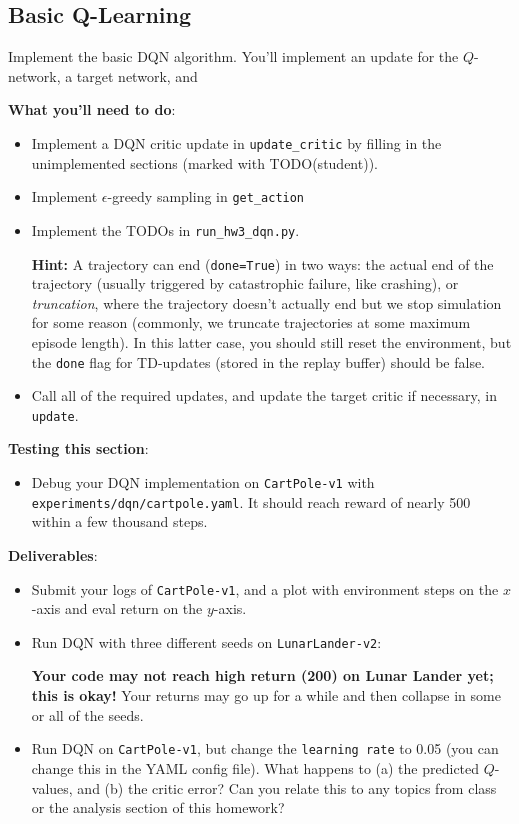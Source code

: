 \documentclass{article}
\begin{document}
\subsection{Basic Q-Learning}

Implement the basic DQN algorithm. You'll implement an update for the $Q$-network, a target network, and 

\textbf{What you'll need to do}:
\begin{itemize}
    \item Implement a DQN critic update in \verb|update_critic| by filling in the unimplemented sections (marked with TODO(student)).
    \item Implement $\epsilon$-greedy sampling in \verb|get_action|
    \item Implement the TODOs in \verb|run_hw3_dqn.py|.

    \textbf{Hint:} A trajectory can end (\verb|done=True|) in two ways: the actual end of the trajectory (usually triggered by catastrophic failure, like crashing), or \textit{truncation}, where the trajectory doesn't actually end but we stop simulation for some reason (commonly, we truncate trajectories at some maximum episode length). In this latter case, you should still reset the environment, but the \verb|done| flag for TD-updates (stored in the replay buffer) should be false.
    \item Call all of the required updates, and update the target critic if necessary, in \verb|update|.
\end{itemize}

\textbf{Testing this section}:
\begin{itemize}
    \item Debug your DQN implementation on \verb|CartPole-v1| with \verb|experiments/dqn/cartpole.yaml|. It should reach reward of nearly 500 within a few thousand steps.
\end{itemize}

\textbf{Deliverables}:
\begin{itemize}
    \item Submit your logs of \verb|CartPole-v1|, and a plot with environment steps on the $x$-axis and eval return on the $y$-axis.
    \item Run DQN with three different seeds on \verb|LunarLander-v2|:

\textbf{Your code may not reach high return (200) on Lunar Lander yet; this is okay!} Your returns may go up for a while and then collapse in some or all of the seeds.
    \item Run DQN on \verb|CartPole-v1|, but change the \verb|learning rate| to 0.05 (you can change this in the YAML config file). What happens to (a) the predicted $Q$-values, and (b) the critic error? Can you relate this to any topics from class or the analysis section of this homework?
\end{itemize}
\end{document}
